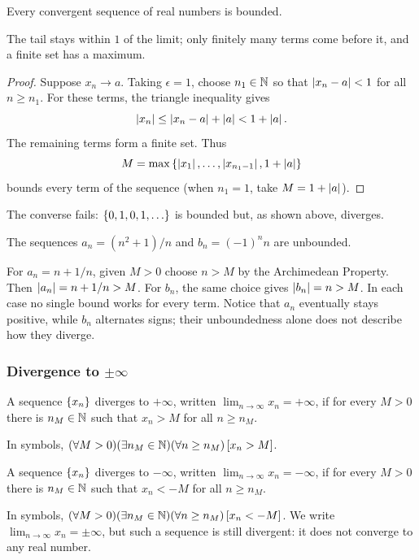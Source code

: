 \begin{theorem}\label{thm:convergent-bounded}
    Every convergent sequence of real numbers is bounded.
\end{theorem}
\begin{idea}
    The tail stays within $1$ of the limit; only finitely many terms come before it, and a finite set has a maximum.
\end{idea}
\begin{proof}
    Suppose $x_n\to a$. Taking $\epsilon=1$, choose $n_1\in\mathbb{N}$ so that $\left|x_n-a\right|<1$ for all $n\geq n_1$. For these terms, the triangle inequality gives
    \[
        \left|x_n\right|\leq\left|x_n-a\right|+\left|a\right|<1+\left|a\right|.
    \]
    The remaining terms form a finite set. Thus
    \[
        M=\max\left\{\left|x_1\right|,\ldots,\left|x_{n_1-1}\right|,1+\left|a\right|\right\}
    \]
    bounds every term of the sequence (when $n_1=1$, take $M=1+\left|a\right|$).
\end{proof}

The converse fails: $\left\{0,1,0,1,\ldots\right\}$ is bounded but, as shown above, diverges.


\begin{example}
    The sequences $a_n=(n^2+1)/n$ and $b_n=(-1)^n n$ are unbounded.
\end{example}
For $a_n=n+1/n$, given $M>0$ choose $n>M$ by the Archimedean Property. Then $\left|a_n\right|=n+1/n>M$. For $b_n$, the same choice gives $\left|b_n\right|=n>M$. In each case no single bound works for every term. Notice that $a_n$ eventually stays positive, while $b_n$ alternates signs; their unboundedness alone does not describe how they diverge.

\subsubsection{Divergence to \texorpdfstring{$\pm\infty$}{Positive or Negative Infinity}}
\begin{definition}\label{def:diverge-plus-infty}
    A sequence $\left\{x_n\right\}$ diverges to $+\infty$, written $\lim_{n\to\infty}x_n=+\infty$, if for every $M>0$ there is $n_M\in\mathbb{N}$ such that $x_n>M$ for all $n\geq n_M$.
\end{definition}
In symbols, $(\forall M>0)(\exists n_M\in\mathbb{N})(\forall n\geq n_M)\,[x_n>M]$.

\begin{definition}\label{def:diverge-minus-infty}
    A sequence $\left\{x_n\right\}$ diverges to $-\infty$, written $\lim_{n\to\infty}x_n=-\infty$, if for every $M>0$ there is $n_M\in\mathbb{N}$ such that $x_n<-M$ for all $n\geq n_M$.
\end{definition}
In symbols, $(\forall M>0)(\exists n_M\in\mathbb{N})(\forall n\geq n_M)\,[x_n<-M]$.
We write $\lim_{n\to\infty}x_n=\pm\infty$, but such a sequence is still divergent: it does not converge to any real number.


